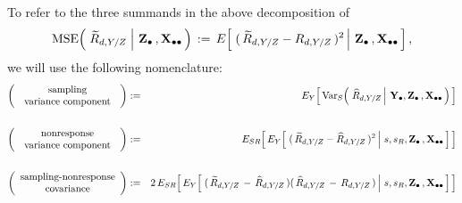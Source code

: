 \vskip 0.75cm
\noindent
To refer to the three summands in the above decomposition of
\begin{equation*}
\textnormal{MSE}\!\left(\,
    \left.
    \widetilde{R}_{d,Y/Z}
    \;\right\vert\,
    \mathbf{Z}_{\bullet}\,,\mathbf{X}_{\bullet\bullet}
    \,\right)
\, := \,
    E\!\left[\,
        \left.
        (\,\widetilde{R}_{d,Y/Z} - R_{d,Y/Z}\,)^{2}
        \,\right\vert\,
        \mathbf{Z}_{\bullet}\,,\mathbf{X}_{\bullet\bullet}
        \,\right],
\end{equation*}
we will use the following nomenclature:
\vskip 0.01cm
\begin{eqnarray*}
\left(\begin{array}{c}
    \textnormal{sampling}
    \\
    \textnormal{\;\,variance component\;\,}
    \end{array}\right)
& := &
    E_{Y}\!\left[\,
    \textnormal{Var}_{S}\!\left(\,
        \left.
        \widehat{R}_{d,Y/Z}
        \,\right\vert\,
        \mathbf{Y}_{\bullet},
        \mathbf{Z}_{\bullet}\,,\mathbf{X}_{\bullet\bullet}
        \,\right)
        \,\right]
\\ \\
\left(\begin{array}{c}
    \textnormal{nonresponse}
    \\
    \textnormal{\;\,variance component\;\,}
    \end{array}\right)
& := &
    E_{SR}\!\left[\,
    E_{Y}\!\left[\,
        \left.
        (\,\widetilde{R}_{d,Y/Z} - \widehat{R}_{d,Y/Z}\,)^{2}
        \,\right\vert\,
        s,s_{R},\mathbf{Z}_{\bullet}\,,\mathbf{X}_{\bullet\bullet}
        \,\right]
        \,\right]
\\ \\
\left(\begin{array}{c}
    \textnormal{sampling-nonresponse}
    \\
    \textnormal{covariance}
    \end{array}\right)
& := &
    2\,
    E_{SR}\!\left[\,
    E_{Y}\!\left[\,
        \left.
        (\,\widetilde{R}_{d,Y/Z} \,-\, \widehat{R}_{d,Y/Z}\,)(\,\widehat{R}_{d,Y/Z} \,-\, R_{d,Y/Z}\,)
        \,\right\vert\,
        s,s_{R},\mathbf{Z}_{\bullet}\,,\mathbf{X}_{\bullet\bullet}
        \,\right]
        \,\right]
\end{eqnarray*}
